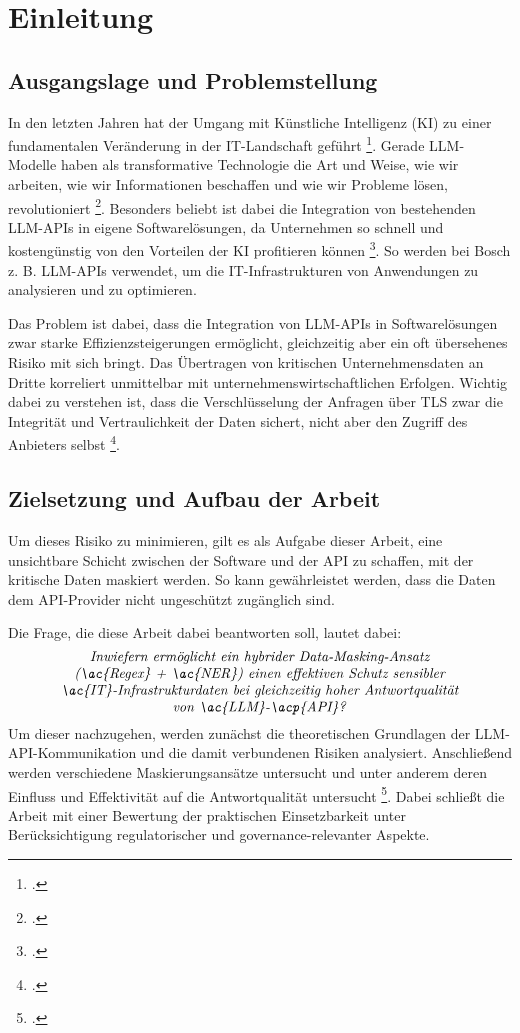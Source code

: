 \chapter{Einleitung}

\section{Ausgangslage und Problemstellung}
In den letzten Jahren hat der Umgang mit Künstliche Intelligenz (KI) zu einer fundamentalen Veränderung in der \ac{IT}-Landschaft geführt \footcite{naveed2023comprehensive}.
Gerade \ac{LLM}-Modelle haben als transformative Technologie die Art und Weise, wie wir arbeiten, wie wir Informationen beschaffen und wie wir Probleme lösen, revolutioniert \footcite{alzubaidi2024researchlandscape}.
Besonders beliebt ist dabei die Integration von bestehenden \ac{LLM}-\acp{API} in eigene Softwarelösungen, da Unternehmen so schnell und kostengünstig von den Vorteilen der \ac{KI} profitieren können \footcite{kucharavy2025impactllmassistants}.
So werden bei Bosch z. B. \ac{LLM}-\acp{API} verwendet, um die \ac{IT}-Infrastrukturen von Anwendungen zu analysieren und zu optimieren.

Das Problem ist dabei, dass die Integration von \ac{LLM}-\acp{API} in Softwarelösungen zwar starke Effizienzsteigerungen ermöglicht, gleichzeitig aber ein oft übersehenes Risiko mit sich bringt. Das Übertragen von kritischen Unternehmensdaten an Dritte korreliert unmittelbar mit unternehmenswirtschaftlichen Erfolgen. Wichtig dabei zu verstehen ist, dass die Verschlüsselung der Anfragen über \ac{TLS} zwar die Integrität und Vertraulichkeit der Daten sichert, nicht aber den Zugriff des Anbieters selbst \footcite{staab2025sokprivacyparadox}.

\section{Zielsetzung und Aufbau der Arbeit}
Um dieses Risiko zu minimieren, gilt es als Aufgabe dieser Arbeit, eine unsichtbare Schicht zwischen der Software und der \ac{API} zu schaffen, mit der kritische Daten maskiert werden. So kann gewährleistet werden, dass die Daten dem \ac{API}-Provider nicht ungeschützt zugänglich sind.

Die Frage, die diese Arbeit dabei beantworten soll, lautet dabei:
\begin{equation}
    \parbox{0.85\textwidth}{\centering \textit{Inwiefern ermöglicht ein hybrider Data-Masking-Ansatz (\ac{Regex} + \ac{NER}) einen effektiven Schutz sensibler \ac{IT}-Infrastrukturdaten bei gleichzeitig hoher Antwortqualität von \ac{LLM}-\acp{API}?}}
\end{equation}
Um dieser nachzugehen, werden zunächst die theoretischen Grundlagen der \ac{LLM}-\ac{API}-Kommunikation und die damit verbundenen Risiken analysiert. Anschließend werden verschiedene Maskierungsansätze untersucht und unter anderem deren Einfluss und Effektivität auf die Antwortqualität untersucht \footcite{zhang2025surveyprivacypreservation}. Dabei schließt die Arbeit mit einer Bewertung der praktischen Einsetzbarkeit unter Berücksichtigung regulatorischer und governance-relevanter Aspekte.
